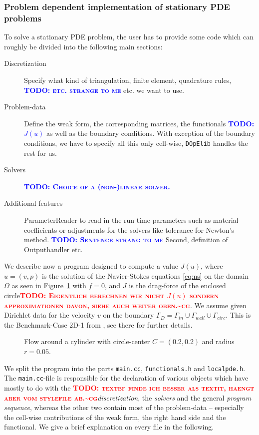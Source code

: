 \documentclass[prodmode,acmtoms]{acmsmall}
\numberwithin{equation}{section}
\newcommand{\dope}{\texttt{DOpElib}}
\newcommand{\todo}[1]{\textbf{\textsc{\textcolor{blue}{TODO: #1}}}}
\newcommand{\todocg}[1]{\textbf{\textsc{\textcolor{red}{TODO: #1\textasciitilde cg}}}}
\begin{document}
\subsubsection{Problem dependent implementation of stationary PDE problems}
To solve a stationary PDE problem, the user has to provide some code which can roughly be divided into the following main sections:
\begin{description}
\item[Discretization] Specify what kind of triangulation,
finite element, quadrature rules, 
\todo{etc. strange to me} etc. we want to use.
\item[Problem-data] 
Define the weak form, 
the corresponding matrices, 
the functionals \todo{$J(u)$} as well as the boundary conditions. With exception of the boundary conditions, we have to specify all this only cell-wise, \dope{} handles the rest for us.
\item[Solvers] \todo{Choice of a (non-)linear solver.}
\item[Additional features] ParameterReader to read in the run-time parameters
  such as material coefficients or adjustments for the solvers like tolerance
  for Newton's method. 
\todo{Sentence strang to me} Second, definition of Outputhandler etc.
\end{description} 

We describe now a program designed to compute a value $J(u)$, where $u=(v,p)$ is the solution of the Navier-Stokes equations \eqref{eq:ns} on the domain $\Omega$ as seen in Figure~\ref{fig:example_ns} with  $f=0$, and $J$ is the drag-force of the enclosed circle\todocg{Eigentlich berechnen wir nicht $J(u)$ sondern approximationen davon, siehe auch weiter oben.}. We assume given Dirichlet data for the velocity $v$ on the boundary $\Gamma_{D}=\Gamma_{in}\cup\Gamma_{wall}\cup\Gamma_{circ}$. This is the Benchmark-Case 2D-1 from \cite{TuSchae96}, see there for further details.
\begin{figure}[h]
\centering
\resizebox{0.5\textwidth}{!}{}
\caption{Flow around a cylinder with 
circle-center $C=(0.2,0.2)$ and radius $r=0.05$.}
\label{fig:example_ns}
\end{figure}
We split the program into the parts \texttt{main.cc}, \texttt{functionals.h} and \texttt{localpde.h}. The \texttt{main.cc}-file is responsible for the declaration of various objects which have mostly to do with the \todocg{textbf finde ich besser als textit, haengt aber vom stylefile ab.}\textit{discretization}, the \textit{solvers} and the general \textit{program sequence}, whereas the other two contain most of the problem-data -- especially the cell-wise contributions of the weak form, the right hand side and the functional. We give a brief explanation on every file in the following.
\end{document}
